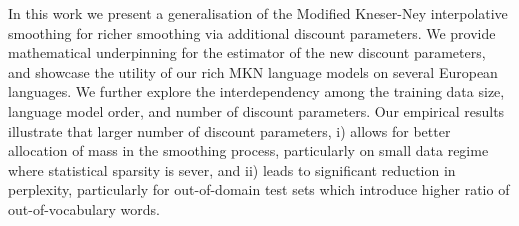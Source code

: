 In this work we present a generalisation of the Modified Kneser-Ney interpolative smoothing for richer smoothing via additional discount parameters. We provide mathematical underpinning for the estimator of the new discount parameters, and showcase the utility of our rich MKN language models on several European languages. We further explore the interdependency among the training data size, language model order, and number of discount parameters. Our empirical results illustrate that larger number of discount parameters, i) allows for better allocation of mass in the smoothing process, particularly on small data regime where statistical sparsity is sever, and ii) leads to significant reduction in perplexity, particularly for out-of-domain test sets which introduce higher ratio of out-of-vocabulary words.
